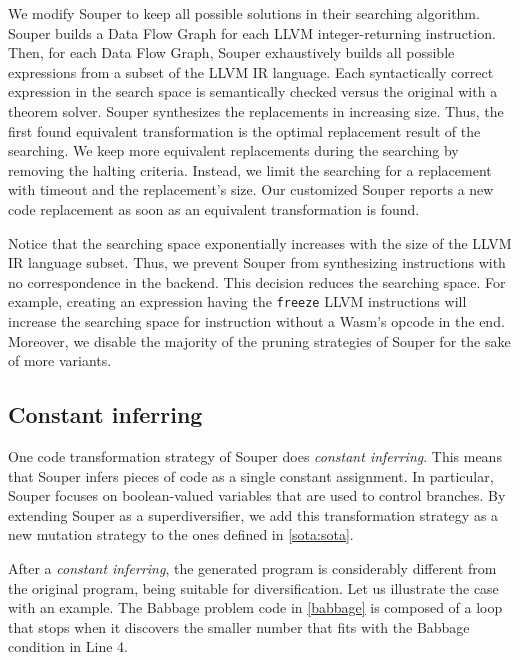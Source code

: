 We modify Souper to keep all possible solutions in their searching algorithm.
Souper builds a Data Flow Graph for each LLVM integer-returning instruction. 
Then, for each Data Flow Graph, Souper exhaustively builds all possible expressions from a subset of the LLVM IR language.
Each syntactically correct expression in the search space is semantically checked versus the original with a theorem solver. Souper synthesizes the replacements in increasing size. Thus, the first found equivalent transformation is the optimal replacement result of the searching. 
We keep more equivalent replacements during the searching by removing the halting criteria. Instead, we limit the searching for a replacement with timeout and the replacement's size. Our customized Souper reports a new code replacement as soon as an equivalent transformation is found.

Notice that the searching space exponentially increases with the size of the LLVM IR language subset. Thus,
we prevent Souper from synthesizing instructions with no correspondence in the \wasm backend. This decision reduces the searching space. For example, creating an expression having the  \texttt{freeze} LLVM instructions will increase the searching space for instruction without a Wasm's opcode in the end.
Moreover, we disable the majority of the pruning strategies of Souper for the sake of more variants. 

\subsection{Constant inferring}

One code transformation strategy of Souper does \emph{constant inferring}. This means that Souper infers pieces of code as a single constant assignment. In particular, Souper focuses on boolean-valued variables that are used to control branches.
By extending Souper as a superdiversifier, we add this transformation strategy as a new mutation strategy to the ones defined in \autoref{sota:sota}. 


After a \emph{constant inferring}, the generated program is considerably different from the original program, being suitable for diversification.
Let us illustrate the case with an example.
The Babbage problem code in \autoref{babbage} is composed of a loop that stops when it discovers the smaller number that fits with the Babbage condition in Line 4.


